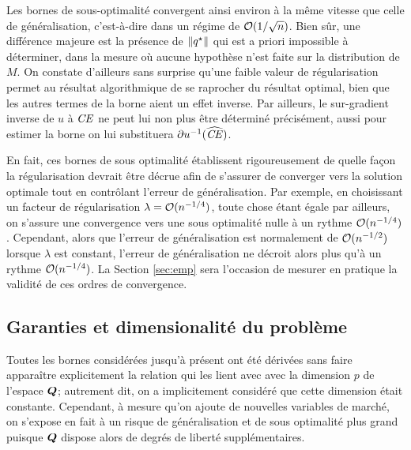 Les bornes de sous-optimalité convergent ainsi environ à la même vitesse que celle de
généralisation, c'est-à-dire dans un régime de $\mathcal O(1/\sqrt{n})$. Bien sûr, une
différence majeure est la présence de $\|q^\star\|$ qui est a priori impossible à déterminer,
dans la mesure où aucune hypothèse n'est faite sur la distribution de $M$. On constate
d'ailleurs sans surprise qu'une faible valeur de régularisation permet au résultat
algorithmique de se raprocher du résultat optimal, bien que les autres termes de la borne
aient un effet inverse. Par ailleurs, le sur-gradient inverse de $u$ à $\operatorname{\mbox{\textit{CE}}}$ ne peut lui
non plus être déterminé précisément, aussi pour estimer la borne on lui substituera
$\partial u^{-1}(\operatorname{\widehat{\operatorname{\mbox{\textit{CE}}}}})$.

En fait, ces bornes de sous optimalité établissent rigoureusement de quelle façon la
régularisation devrait être décrue afin de s'assurer de converger vers la solution
optimale tout en contrôlant l'erreur de généralisation. Par exemple, en choisissant un
facteur de régularisation $\lambda = \mathcal O(n^{-1/4})$, toute chose étant égale par ailleurs, on
s'assure une convergence vers une sous optimalité nulle à un rythme
$\mathcal O(n^{-1/4})$. Cependant, alors que l'erreur de généralisation est normalement de
$\mathcal O(n^{-1/2})$ lorsque $\lambda$ est constant, l'erreur de généralisation ne décroit alors
plus qu'à un rythme $\mathcal O(n^{-1/4})$. La Section \ref{sec:emp} sera l'occasion de mesurer
en pratique la validité de ces ordres de convergence. 




\subsection{Garanties et dimensionalité du problème}
\label{b:dim}

Toutes les bornes considérées jusqu'à présent ont été dérivées sans faire apparaître
explicitement la relation qui les lient avec avec la dimension $p$ de l'espace $\bm Q$;
autrement dit, on a implicitement considéré que cette dimension était
constante. Cependant, à mesure qu'on ajoute de nouvelles variables de marché, on s'expose
en fait à un risque de généralisation et de sous optimalité plus grand puisque $\bm Q$
dispose alors de degrés de liberté supplémentaires.

